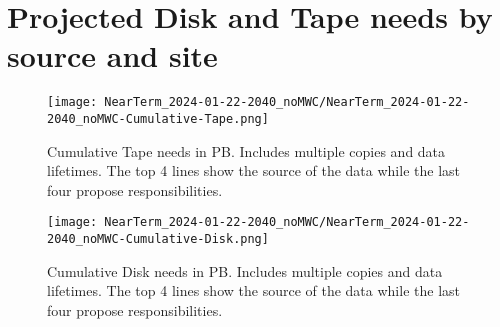 \section{Projected Disk and Tape needs by source and site}
\begin{figure}[h]
\centering\texttt{[image: NearTerm\_2024-01-22-2040\_noMWC/NearTerm\_2024-01-22-2040\_noMWC-Cumulative-Tape.png]}
\caption{Cumulative Tape needs in PB. Includes multiple copies and data lifetimes. The top 4 lines show the source of the data while the last four propose responsibilities.}
\label{fig:Cumulative-Tape}
\end{figure}
\begin{figure}[h]
\centering\texttt{[image: NearTerm\_2024-01-22-2040\_noMWC/NearTerm\_2024-01-22-2040\_noMWC-Cumulative-Disk.png]}
\caption{Cumulative Disk needs in PB. Includes multiple copies and data lifetimes. The top 4 lines show the source of the data while the last four propose responsibilities.}
\label{fig:Cumulative-Disk}
\end{figure}
